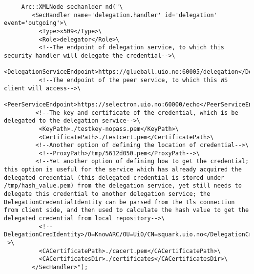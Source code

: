 \documentclass{book}
\begin{document}
\begin{verbatim}
     Arc::XMLNode sechanlder_nd("\ 
        <SecHandler name='delegation.handler' id='delegation' event='outgoing'>\ 
          <Type>x509</Type>\ 
          <Role>delegator</Role>\ 
          <!--The endpoint of delegation service, to which this security handler will delegate the credential-->\
          <DelegationServiceEndpoint>https://glueball.uio.no:60005/delegation</DelegationServiceEndpoint>\ 
          <!--The endpoint of the peer service, to which this WS client will access-->\
          <PeerServiceEndpoint>https://selectron.uio.no:60000/echo</PeerServiceEndpoint>\ 
         <!--The key and certificate of the credential, which is be delegated to the delegation service-->\
          <KeyPath>./testkey-nopass.pem</KeyPath>\ 
          <CertificatePath>./testcert.pem</CertificatePath>\ 
         <!--Another option of defining the location of credential-->\
          <!--ProxyPath>/tmp/5612d050.pem</ProxyPath-->\ 
         <!--Yet another option of defining how to get the credential; this option is useful for the service which has already acquired the delegated credential (this delegated credential is stored under /tmp/hash_value.pem) from the delegation service, yet still needs to delegate this credential to another delegation service; the DelegationCredentialIdentity can be parsed from the tls connection from client side, and then used to calculate the hash value to get the delegated credential from local repository-->\
          <!--DelegationCredIdentity>/O=KnowARC/OU=UiO/CN=squark.uio.no</DelegationCredIdentity-->\ 
          <CACertificatePath>./cacert.pem</CACertificatePath>\ 
          <CACertificatesDir>./certificates</CACertificatesDir>\ 
        </SecHandler>"); 
\end{verbatim}


\end{document}

